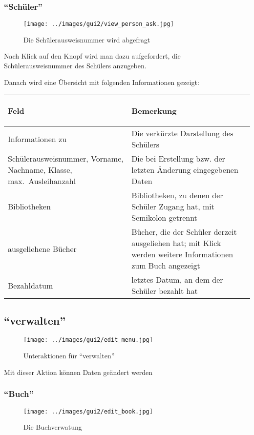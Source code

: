 \subsubsection{``Schüler''}
\label{subsubsec:detail:view:person}
\begin{figure}\texttt{[image: ../images/gui2/view\_person\_ask.jpg]}\caption{Die Schülerausweisnummer wird abgefragt}\label{fig:view_person_ask}\end{figure}

Nach Klick auf den Knopf wird man dazu aufgefordert, die Schüler\-ausweis\-nummer des Schülers anzugeben.

Danach wird eine Übersicht mit folgenden Informationen gezeigt:

\begin{tabular}{|p{}|p{}|}\hline
\begin{center}Feld\end{center} & \begin{center}Bemerkung\end{center}\\
\hline
Informationen zu & Die verkürzte Darstellung des Schülers\\
\hline
Schülerausweisnummer, Vorname, Nachname, Klasse, max.~Ausleihanzahl & Die bei Erstellung bzw. der letzten Änderung eingegebenen Daten\\
\hline
Bibliotheken & Bibliotheken, zu denen der Schüler Zugang hat, mit Semikolon getrennt\\
\hline
ausgeliehene Bücher & Bücher, die der Schüler derzeit ausgeliehen hat; mit Klick werden weitere Informationen zum Buch angezeigt\\
\hline
Bezahldatum & letztes Datum, an dem der Schüler bezahlt hat\\
\hline
\end{tabular}

\subsection{``verwalten''}
\label{subsec:detail:edit}
\begin{figure}\texttt{[image: ../images/gui2/edit\_menu.jpg]}\caption{Unteraktionen für ``verwalten''}\label{fig:edit_menu}\end{figure}

Mit dieser Aktion können Daten geändert werden

\subsubsection{``Buch''}
\label{subsubsec:detail:edit:book}
\begin{figure}\texttt{[image: ../images/gui2/edit\_book.jpg]}\caption{Die Buchverwatung}\label{fig:edit_book}\end{figure}

